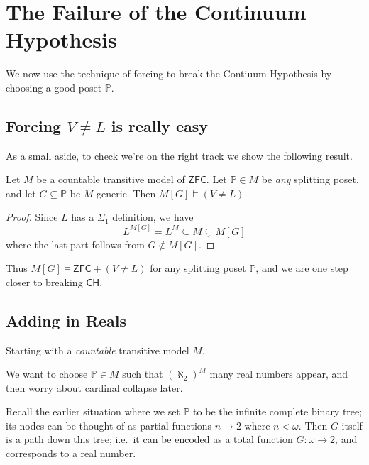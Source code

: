 \documentclass[11pt]{scrreprt}
\newcommand{\CH}{\mathsf{CH}}
\newcommand{\ZFC}{\mathsf{ZFC}}
\newcommand{\Name}{\text{Name}}
\newcommand{\Po}{\mathbb P}
\newcommand{\nrank}{\opname{n-rank}} %
\begin{document}




\chapter{The Failure of the Continuum Hypothesis}
We now use the technique of forcing to break the Contiuum Hypothesis by choosing a good poset $\Po$.

\section{Forcing $V \neq L$ is really easy}
As a small aside, to check we're on the right track we show the following result.

\begin{theorem}[$V \ne L$]
	Let $M$ be a countable transitive model of $\ZFC$.
	Let $\Po \in M$ be \emph{any} splitting poset,
	and let $G \subseteq \Po$ be $M$-generic.
	Then $M[G] \vDash (V \neq L)$.
\end{theorem}
\begin{proof}
	Since $L$ has a $\Sigma_1$ definition,
	we have \[ L^{M[G]} = L^M \subseteq M \subsetneq M[G] \]
	where the last part follows from $G \notin M[G]$.
\end{proof}

Thus $M[G] \vDash \ZFC + (V \ne L)$ for any splitting poset $\Po$,
and we are one step closer to breaking $\CH$.

\section{Adding in Reals}
Starting with a \emph{countable} transitive model $M$.

We want to choose $\Po \in M$ such that $(\aleph_2)^M$ many real numbers appear,
and then worry about cardinal collapse later.

Recall the earlier situation where we set $\Po$ to be the infinite complete binary tree; its nodes can be thought of as partial functions $n \to 2$ where $n < \omega$.
Then $G$ itself is a path down this tree; i.e.\ it can be encoded as a total function $G : \omega \to 2$,
and corresponds to a real number.
\end{document}
